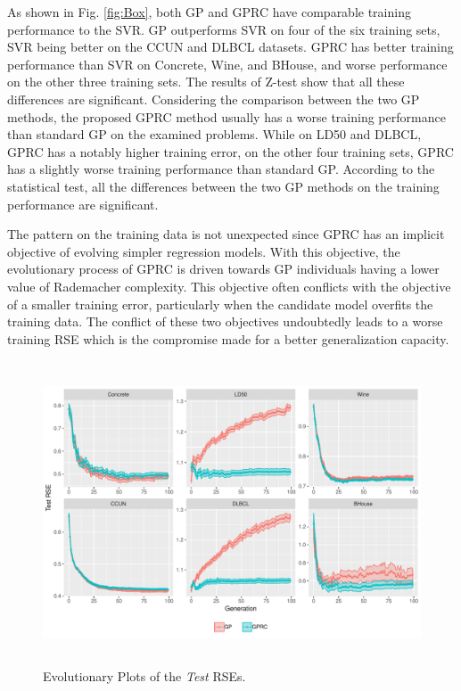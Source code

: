 \documentclass[conference]{IEEEtran}
\begin{document}
As shown in Fig. \ref{fig:Box}, both GP and GPRC have comparable training performance to the SVR. GP outperforms SVR on four of the six training sets, SVR being better on the CCUN and DLBCL datasets. GPRC has better training performance than SVR on Concrete, Wine, and BHouse, and worse performance on the other three training sets. The results of Z-test show that all these differences are significant. Considering the comparison between the two GP methods, the proposed GPRC method usually has a worse training performance than standard GP on the examined problems. While on LD50 and DLBCL, GPRC has a notably higher training error, on the other four training sets, GPRC has a slightly worse training performance than standard GP. According to the statistical test, all the differences between the two GP methods on the training performance are significant. 

The pattern on the training data is not unexpected since GPRC has an implicit objective of evolving simpler regression models. With this objective, the evolutionary process of GPRC is driven towards GP individuals having a lower value of Rademacher complexity. This objective often conflicts with the objective of a smaller training error, particularly when the candidate model overfits the training data. The conflict of these two objectives  undoubtedly leads to a worse training RSE which is the compromise made for a better generalization capacity.

\begin{figure}[t]
	\centering
	\includegraphics[height=9cm, width=13cm]{Plot}
	\caption{Evolutionary Plots of the \textit{Test} RSEs.}
	\label{fig:Plot}
\end{figure}
\end{document}
